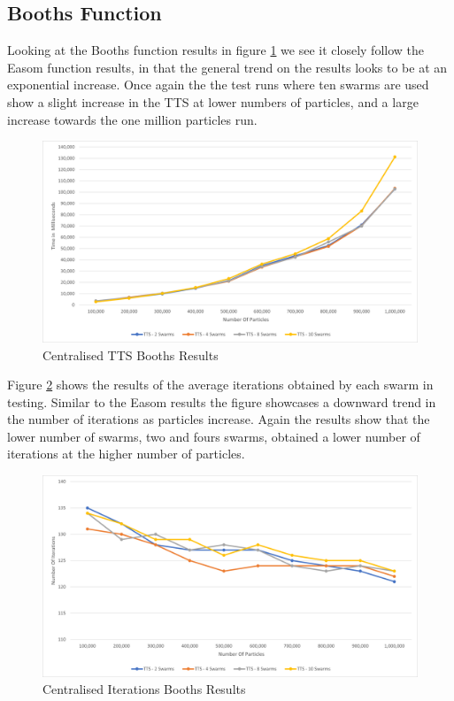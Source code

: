\documentclass[oneside,12pt]{book}
\begin{document}
\subsection{Booths Function}
Looking at the Booths function results in figure \ref{fig:Centralised_TTS_Booths_Results} we see it closely follow the Easom function results, in that the general trend on the results looks to be at an exponential increase. Once again the the test runs where ten swarms are used show a slight increase in the TTS at lower numbers of particles, and a large increase towards the one million particles run.

\begin{figure}[H]
    \centering
    \includegraphics[scale=0.45]{Images/Graphs/CentralisedBoothsTTS.png}
    \caption{Centralised TTS Booths Results}
    \label{fig:Centralised_TTS_Booths_Results}
\end{figure}

Figure \ref{fig:Centralised_Epoc_Booths_Results} shows the results of the average iterations obtained by each swarm in testing. Similar to the Easom results the figure showcases a downward trend in the number of iterations as particles increase. Again the results show that the lower number of swarms, two and fours swarms, obtained a lower number of iterations at the higher number of particles. 

\begin{figure}[H]
    \centering
    \includegraphics[scale=0.45]{Images/Graphs/CentralisedBoothsEpoch.png}
    \caption{Centralised Iterations Booths Results}
    \label{fig:Centralised_Epoc_Booths_Results}
\end{figure}
\end{document}
